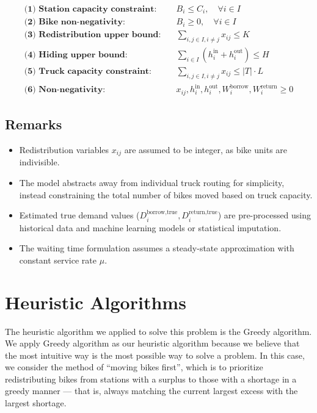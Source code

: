 \documentclass[11pt,a4paper]{article}
\begin{document}
\begin{align*}
\textbf{(1) Station capacity constraint:} & \quad B_i \leq C_i, \quad \forall i \in I \\
\textbf{(2) Bike non-negativity:} & \quad B_i \geq 0, \quad \forall i \in I \\
\textbf{(3) Redistribution upper bound:} & \quad \sum_{i,j \in I, i \ne j} x_{ij} \leq K \\
\textbf{(4) Hiding upper bound:} & \quad \sum_{i \in I} \left(h_i^{\text{in}} + h_i^{\text{out}}\right) \leq H \\
\textbf{(5) Truck capacity constraint:} & \quad \sum_{i,j \in I, i \ne j} x_{ij} \leq |T| \cdot L \\
\textbf{(6) Non-negativity:} & \quad x_{ij}, h_i^{\text{in}}, h_i^{\text{out}}, W_i^{\text{borrow}}, W_i^{\text{return}} \geq 0
\end{align*}

\subsection*{Remarks}

\begin{itemize}
    \item Redistribution variables $x_{ij}$ are assumed to be integer, as bike units are indivisible.
    \item The model abstracts away from individual truck routing for simplicity, instead constraining the total number of bikes moved based on truck capacity.
    \item Estimated true demand values ($D_i^{\text{borrow,true}}, D_i^{\text{return,true}}$) are pre-processed using historical data and machine learning models or statistical imputation.
    \item The waiting time formulation assumes a steady-state approximation with constant service rate $\mu$.
\end{itemize}




\section{Heuristic Algorithms}

The heuristic algorithm we applied to solve this problem is the Greedy algorithm.
We apply Greedy algorithm as our heuristic algorithm because we believe that the most intuitive way is the most possible way to solve a problem. 
In this case, we consider the method of “moving bikes first”, which is to prioritize redistributing bikes from stations with a surplus to those with a shortage in a greedy manner — that is, always matching the current largest excess with the largest shortage.
\end{document}
